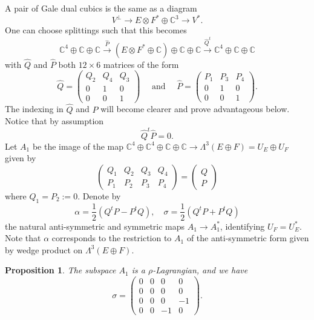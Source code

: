 \documentclass[11pt]{amsart}
\theoremstyle{plain}
\newtheorem{proposition}[theorem]{Proposition}
\numberwithin{equation}{section}
\theoremstyle{definition}
\theoremstyle{remark}
\newcommand{\C}{\mathbb C}
\begin{document}
A pair of Gale dual cubics is the same as a diagram 
\[
	V^\perp \to E\otimes F^* \oplus \C^3 \to V^*.
\]
One can choose splittings such that this becomes 
\[
	\mathbb{C}^4 \oplus \C \oplus \C \xrightarrow{\widehat{P}} (E\otimes F^* \oplus \mathbb{C}) \oplus \mathbb{C} \oplus \C  \xrightarrow{\widehat{Q}^t} \mathbb{C}^4 \oplus \C \oplus \C
\]
with $\widehat{Q}$ and $\widehat{P}$ both $12\times 6$ matrices of the form 
\[
\widehat{Q} = \begin{pmatrix}
	Q_2 & Q_4& Q_3 \\
	0& 1& 0 \\
	0 & 0 & 1
\end{pmatrix}
\quad \text{ and }\quad
\widehat{P} = \begin{pmatrix}
	P_1 & P_3 & P_4 \\
	0& 1& 0 \\
	0 & 0 & 1
\end{pmatrix}.
\]
The indexing in $\widehat{Q}$ and $\widehat{P}$ will become clearer and prove advantageous below. Notice that by assumption
\[ 
\widehat{Q}^t\widehat{P}
=0.
\]
Let $A_1$ be the image of the map $\C^4 \oplus \C^ 4 \oplus \C \oplus \C \to \Lambda^3 (E \oplus F) = U_E \oplus U_F$ given by 
\[
\begin{pmatrix}
Q_1 & Q_2 & Q_3 & Q_4 \\
P_1 & P_2 & P_3 & P_4 
\end{pmatrix} = \begin{pmatrix} Q \\ P \end{pmatrix}
\]
where $Q_1=P_2:=0$. Denote by 
\[
\alpha=\frac{1}{2}(Q^tP -P^tQ), \quad \sigma= \frac{1}{2}(Q^tP +P^tQ)
\]
the natural anti-symmetric and symmetric maps $A_1 \to A^*_1$, identifying $U_F = U_E^*$. Note that $\alpha$ corresponds to the restriction to $A_1$ of the anti-symmetric form given by wedge product on $\Lambda^3 (E \oplus F) $. 

\begin{proposition}\label{pRhoLagrangian}
The subspace $A_1$ is a $\rho$-Lagrangian, and we have 
\[
\sigma = \begin{pmatrix}
0 & 0 & 0 & 0\\
0 & 0 & 0 & 0\\
0 & 0 & 0 & -1\\
0 & 0 & -1 & 0
\end{pmatrix}.
\]
\end{proposition}
\end{document}
